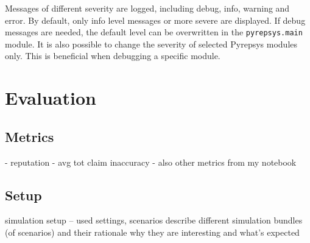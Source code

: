 \documentclass[%
    ]{\PathToTumTemplate/thesis/tum_thesis}
\begin{document}
Messages of different severity are logged, including debug, info, warning and error.
By default, only info level messages or more severe are displayed.
If debug messages are needed, the default level can be overwritten in the \texttt{pyrepsys.main} module.
It is also possible to change the severity of selected Pyrepsys modules only.
This is beneficial when debugging a specific module.




\chapter{Evaluation} \label{chap:evaluation}


\section{Metrics}\label{sec:metrics}

- reputation
- avg tot claim inaccuracy
- also other metrics from my notebook

\section{Setup}\label{sec:setup}

simulation setup -- used settings, scenarios
describe different simulation bundles (of scenarios) and their rationale
why they are interesting and what's expected

\end{document}
